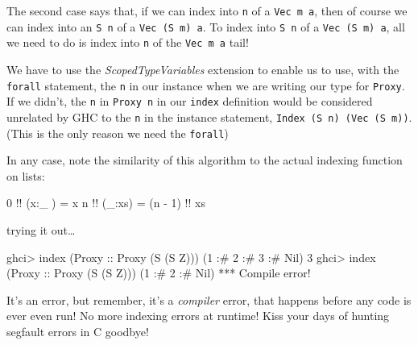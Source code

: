 \documentclass[]{article}
\newenvironment{Shaded}{}{}
\newcommand{\DataTypeTok}[1]{\textcolor[rgb]{0.56,0.13,0.00}{{#1}}}
\newcommand{\DecValTok}[1]{\textcolor[rgb]{0.25,0.63,0.44}{{#1}}}
\newcommand{\OtherTok}[1]{\textcolor[rgb]{0.00,0.44,0.13}{{#1}}}
\newcommand{\FunctionTok}[1]{\textcolor[rgb]{0.02,0.16,0.49}{{#1}}}
\newcommand{\NormalTok}[1]{{#1}}
\begin{document}
The second case says that, if we can index into \texttt{n} of a
\texttt{Vec\ m\ a}, then of course we can index into an \texttt{S\ n} of
a \texttt{Vec\ (S\ m)\ a}. To index into \texttt{S\ n} of a
\texttt{Vec\ (S\ m)\ a}, all we need to do is index into \texttt{n} of
the \texttt{Vec\ m\ a} tail!

We have to use the \emph{ScopedTypeVariables} extension to enable us to
use, with the \texttt{forall} statement, the \texttt{n} in our instance
when we are writing our type for \texttt{Proxy}. If we didn't, the
\texttt{n} in \texttt{Proxy\ n} in our \texttt{index} definition would
be considered unrelated by GHC to the \texttt{n} in the instance
statement, \texttt{Index\ (S\ n)\ (Vec\ (S\ m))}. (This is the only
reason we need the \texttt{forall})

In any case, note the similarity of this algorithm to the actual
indexing function on lists:

\begin{Shaded}
\begin{Highlighting}[]
\DecValTok{0} \FunctionTok{!!} \NormalTok{(x}\FunctionTok{:}\NormalTok{_ ) }\FunctionTok{=} \NormalTok{x}
\NormalTok{n }\FunctionTok{!!} \NormalTok{(_}\FunctionTok{:}\NormalTok{xs) }\FunctionTok{=} \NormalTok{(n }\FunctionTok{-} \DecValTok{1}\NormalTok{) }\FunctionTok{!!} \NormalTok{xs}
\end{Highlighting}
\end{Shaded}

trying it out\ldots{}

\begin{Shaded}
\begin{Highlighting}[]
\NormalTok{ghci}\FunctionTok{>} \NormalTok{index (}\DataTypeTok{Proxy}\OtherTok{ ::} \DataTypeTok{Proxy} \NormalTok{(}\DataTypeTok{S} \NormalTok{(}\DataTypeTok{S} \DataTypeTok{Z}\NormalTok{))) (}\DecValTok{1} \FunctionTok{:#} \DecValTok{2} \FunctionTok{:#} \DecValTok{3} \FunctionTok{:#} \DataTypeTok{Nil}\NormalTok{)}
\DecValTok{3}
\NormalTok{ghci}\FunctionTok{>} \NormalTok{index (}\DataTypeTok{Proxy}\OtherTok{ ::} \DataTypeTok{Proxy} \NormalTok{(}\DataTypeTok{S} \NormalTok{(}\DataTypeTok{S} \DataTypeTok{Z}\NormalTok{))) (}\DecValTok{1} \FunctionTok{:#} \DecValTok{2} \FunctionTok{:#} \DataTypeTok{Nil}\NormalTok{)}
\FunctionTok{***} \DataTypeTok{Compile} \NormalTok{error}\FunctionTok{!}
\end{Highlighting}
\end{Shaded}

It's an error, but remember, it's a \emph{compiler} error, that happens
before any code is ever even run! No more indexing errors at runtime!
Kiss your days of hunting segfault errors in C goodbye!
\end{document}

